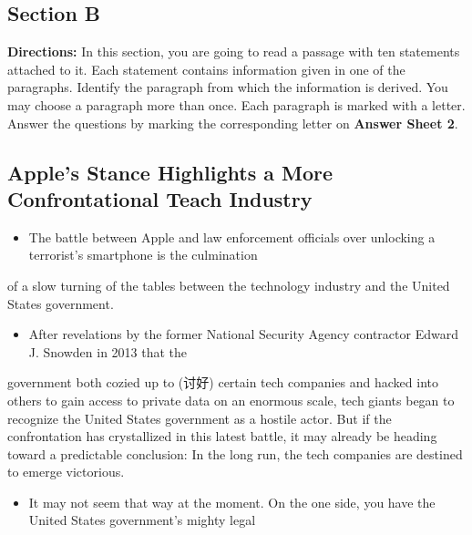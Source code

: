 \documentclass[UTF8,11pt]{ctexart}
\begin{document}
\subsection*{\textbf{Section B}}


\textbf{Directions:} In this section, you are going to read a passage with ten statements attached to it. Each statement contains information given in one of the paragraphs. Identify the paragraph from which the information is derived. You may choose a paragraph more than once. Each paragraph is marked with a letter. Answer the questions by marking the corresponding letter on\textbf{ Answer Sheet 2}.


\subsection*{\textbf{Apple’s Stance Highlights a More Confrontational Teach Industry}}


\begin{itemize}[leftmargin=2em,itemsep=.2em,topsep=.4em]\item[A.] The battle between Apple and law enforcement officials over unlocking a terrorist’s smartphone is the culmination
\end{itemize}

of a slow turning of the tables between the technology industry and the United States government.


\begin{itemize}[leftmargin=2em,itemsep=.2em,topsep=.4em]\item[B.] After revelations by the former National Security Agency contractor Edward J. Snowden in 2013 that the
\end{itemize}

government both cozied up to (讨好) certain tech companies and hacked into others to gain access to private data on an enormous scale, tech giants began to recognize the United States government as a hostile actor. But if the confrontation has crystallized in this latest battle, it may already be heading toward a predictable conclusion: In the long run, the tech companies are destined to emerge victorious.


\begin{itemize}[leftmargin=2em,itemsep=.2em,topsep=.4em]\item[C.] It may not seem that way at the moment. On the one side, you have the United States government’s mighty legal
\end{itemize}
\end{document}
